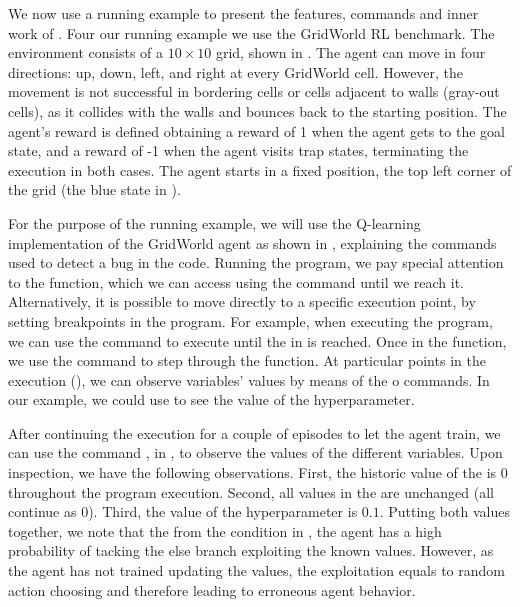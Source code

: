 We now use a running example to present the features, commands and inner work of \flik. Four 
our running example we use the GridWorld \ac{RL} benchmark. The environment consists of a 
$10 \times 10$ grid, shown in . The agent can move in four directions: up, down, 
left, and right at every GridWorld cell. However, the movement is not successful in bordering cells 
or cells adjacent to walls (\ie gray-out cells), as it collides with the walls and bounces back to the 
starting position.
The agent's reward is defined obtaining a reward of 1 when the agent gets to the goal state, and a 
reward of -1 when the agent visits trap states, terminating the execution in both cases. The agent 
starts in a fixed position, the top left corner of the grid (the blue state in ). 

For the purpose of the running example, we will use the Q-learning implementation of the GridWorld 
agent as shown in , explaining the \flik commands used to detect a bug in 
the code. Running the program, we pay special attention to the  function, which we can 
access using the  command until we reach it. Alternatively, it is possible to move directly to a 
specific execution point, by setting breakpoints in the program. For example, when executing the 
program, we can use the  command to execute until the  in  
is reached. Once in the function, we use the  command to step through the function. 
At particular points in the execution (\eg {}), we can observe variables' values by means 
of the  o  commands. In our example, we could use  to see the 
value of the  hyperparameter. 

After continuing the execution for a couple of episodes to let the agent train, we can use the 
command , in , to observe the values of the different variables. Upon 
inspection, we have the following observations. First, the historic value of the  is $0$ 
throughout the program execution. Second, all values in the  are unchanged (all continue 
as 0). Third, the value of the  hyperparameter is $0.1$. 
Putting both values together, we note that the from the condition in , the agent has a 
high probability of tacking the else branch exploiting the known values. However, as the agent has 
not trained updating the values, the exploitation equals to random action choosing and therefore 
leading to erroneous agent behavior.

